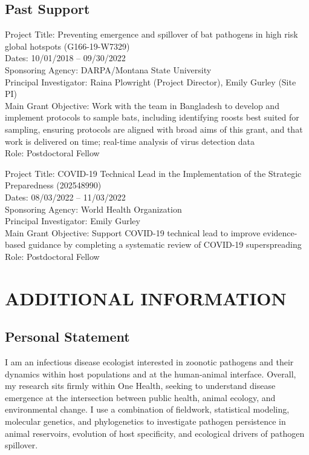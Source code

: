 \documentclass{cv}
\begin{document}
\subsection*{Past Support}

Project Title: Preventing emergence and spillover of bat pathogens in high risk global hotspots (G166-19-W7329) \\
Dates: 10/01/2018 -- 09/30/2022 \\
Sponsoring Agency: DARPA/Montana State University \\
Principal Investigator: Raina Plowright (Project Director), Emily Gurley (Site PI) \\
Main Grant Objective: Work with the team in Bangladesh to develop and implement protocols to sample bats, including identifying roosts best suited for sampling, ensuring protocols are aligned with broad aims of this grant, and that work is delivered on time; real-time analysis of virus detection data \\
Role: Postdoctoral Fellow

Project Title: COVID-19 Technical Lead in the Implementation of the Strategic Preparedness (202548990) \\
Dates: 08/03/2022 -- 11/03/2022 \\
Sponsoring Agency: World Health Organization \\
Principal Investigator: Emily Gurley \\
Main Grant Objective: Support COVID-19 technical lead to improve evidence-based guidance by completing a systematic review of COVID-19 superspreading \\
Role: Postdoctoral Fellow


\section*{ADDITIONAL INFORMATION}

\subsection*{Personal Statement}

I am an infectious disease ecologist interested in zoonotic pathogens and their dynamics within host populations and at the human-animal interface. Overall, my research sits firmly within One Health, seeking to understand disease emergence at the intersection between public health, animal ecology, and environmental change. I use a combination of fieldwork, statistical modeling, molecular genetics, and phylogenetics to investigate pathogen persistence in animal reservoirs, evolution of host specificity, and ecological drivers of pathogen spillover.
\end{document}
